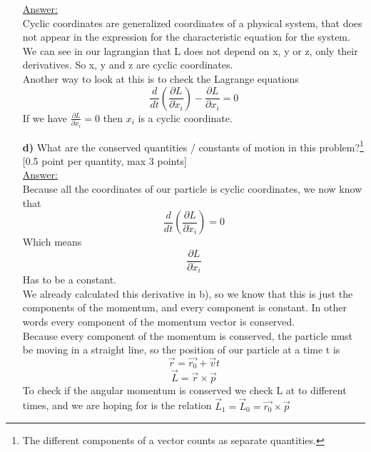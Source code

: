 \documentclass[11pt,a4paper]{report}
\newcounter{excount}[chapter]
\newenvironment{exercise}[1][]{\addtocounter{excount}{1} \noindent {\bf Question
    \arabic{excount} \ \ #1}\hspace{2mm}}{\vspace{4mm}}
\begin{document}
\begin{exercise}{\bf A (boring) Lagrangian\\}
\begin{itemize}
\underline{Answer:}\\
Cyclic coordinates are generalized coordinates of a physical system, that does not appear in the expression for the characteristic equation for the system. We can see in our lagrangian that L does not depend on x, y or z, only their derivatives. So x, y and z are cyclic coordinates.\\
Another way to look at this is to check the Lagrange equations
\begin{equation}
\frac{d}{dt}\left(\frac{\partial L}{\partial \dot{x}_i}\right) - \frac{\partial L}{\partial x_i} = 0
\end{equation}
If we have $\frac{\partial L}{\partial x_i} = 0$ then $x_i$ is a cyclic coordinate.

\item[\bf d)] What are the conserved quantities / constants of motion in this problem?\footnote{The different components of a vector counts as separate quantities.} [0.5 point per quantity, max 3 points]\\



\underline{Answer:}\\
Because all the coordinates of our particle is cyclic coordinates, we now know that
\begin{equation}
\frac{d}{dt}\left(\frac{\partial L}{\partial \dot{x}_i}\right) = 0
\end{equation}
Which means 
\begin{equation}
\frac{\partial L}{\partial \dot{x}_i}
\end{equation}
Has to be a constant.\\
We already calculated this derivative in b), so we know that this is just the components of the momentum, and every component is constant. In other words every component of the momentum vector is conserved.\\

Because every component of the momentum is conserved, the particle must be moving in a straight line, so the position of our particle at a time t is
\begin{equation}
\vec{r} = \vec{r_0} + \vec{v}t
\end{equation}
\begin{equation}
\vec{L} = \vec{r} \times \vec{p}
\end{equation}
To check if the angular momentum is conserved we check L at to different times, and we are hoping for is the relation $\vec{L}_1 = \vec{L}_0 = \vec{r_0} \times \vec{p}$\\


\end{itemize}
\end{exercise}
\end{document}
